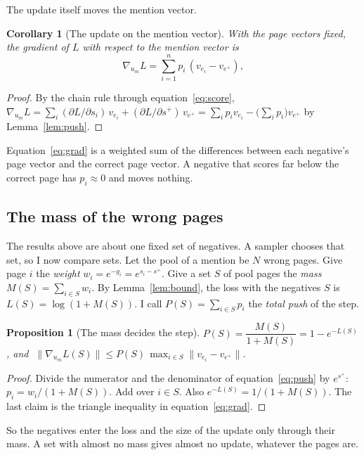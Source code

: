 \documentclass[11pt]{article}
\newtheorem{proposition}{Proposition}
\newtheorem{corollary}{Corollary}
\theoremstyle{definition}
\begin{document}
The update itself moves the mention vector.

\begin{corollary}[The update on the mention vector]
\label{cor:grad}
With the page vectors fixed, the gradient of $L$ with respect to the mention vector is
\begin{equation}
  \nabla_{u_m} L = \sum_{i=1}^{n} p_i\,(v_{e_i} - v_{e^{+}}),
  \label{eq:grad}
\end{equation}
\end{corollary}
\begin{proof}
By the chain rule through equation~\ref{eq:score}, $\nabla_{u_m} L = \sum_i (\partial L/\partial s_i)\, v_{e_i} + (\partial L/\partial s^{+})\, v_{e^{+}} = \sum_i p_i v_{e_i} - \bigl(\sum_i p_i\bigr) v_{e^{+}}$ by Lemma~\ref{lem:push}.
\end{proof}

Equation~\ref{eq:grad} is a weighted sum of the differences between each negative's page vector and the correct page vector. A negative that scores far below the correct page has $p_i \approx 0$ and moves nothing.

\subsection{The mass of the wrong pages}
\label{sec:teach}

The results above are about one fixed set of negatives. A sampler chooses that set, so I now compare sets. Let the pool of a mention be $N$ wrong pages. Give page $i$ the \emph{weight} $w_i = e^{-g_i} = e^{s_i - s^{+}}$. Give a set $S$ of pool pages the \emph{mass} $M(S) = \sum_{i \in S} w_i$. By Lemma~\ref{lem:bound}, the loss with the negatives $S$ is $L(S) = \log(1 + M(S))$. I call $P(S) = \sum_{i \in S} p_i$ the \emph{total push} of the step.

\begin{proposition}[The mass decides the step]
\label{prop:mass}
$P(S) = \dfrac{M(S)}{1 + M(S)} = 1 - e^{-L(S)}$, and $\;\|\nabla_{u_m} L(S)\| \le P(S)\,\max_{i \in S} \|v_{e_i} - v_{e^{+}}\|$.
\end{proposition}
\begin{proof}
Divide the numerator and the denominator of equation~\ref{eq:push} by $e^{s^{+}}$: $p_i = w_i / (1 + M(S))$. Add over $i \in S$. Also $e^{-L(S)} = 1/(1 + M(S))$. The last claim is the triangle inequality in equation~\ref{eq:grad}.
\end{proof}

So the negatives enter the loss and the size of the update only through their mass. A set with almost no mass gives almost no update, whatever the pages are.
\end{document}

